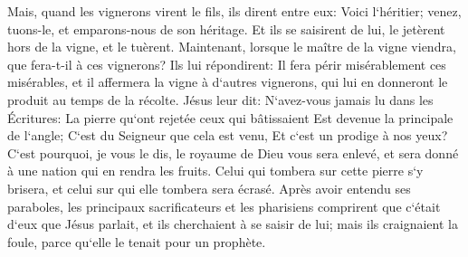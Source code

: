 \verse Mais, quand les vignerons virent le fils, ils dirent entre eux: Voici l`héritier; venez, tuons-le, et emparons-nous de son héritage. 
\verse Et ils se saisirent de lui, le jetèrent hors de la vigne, et le tuèrent. 
\verse Maintenant, lorsque le maître de la vigne viendra, que fera-t-il à ces vignerons? 
\verse Ils lui répondirent: Il fera périr misérablement ces misérables, et il affermera la vigne à d`autres vignerons, qui lui en donneront le produit au temps de la récolte. 
\verse Jésus leur dit: N`avez-vous jamais lu dans les Écritures: La pierre qu`ont rejetée ceux qui bâtissaient Est devenue la principale de l`angle; C`est du Seigneur que cela est venu, Et c`est un prodige à nos yeux? 
\verse C`est pourquoi, je vous le dis, le royaume de Dieu vous sera enlevé, et sera donné à une nation qui en rendra les fruits. 
\verse Celui qui tombera sur cette pierre s`y brisera, et celui sur qui elle tombera sera écrasé. 
\verse Après avoir entendu ses paraboles, les principaux sacrificateurs et les pharisiens comprirent que c`était d`eux que Jésus parlait, 
\verse et ils cherchaient à se saisir de lui; mais ils craignaient la foule, parce qu`elle le tenait pour un prophète. 

\chapter{}

